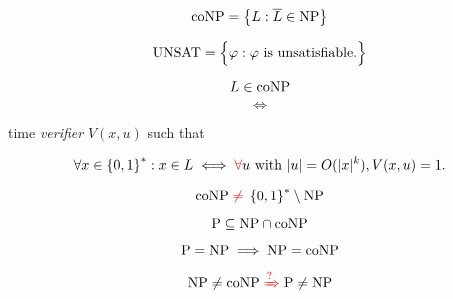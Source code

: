 
\begin{frame}
  \pause
  \[
	\text{coNP} = \left\{ L: \overline{L} \in \text{NP} \right\}
  \]

  \pause
  \[
	\text{UNSAT} = \Big\{ \varphi: \varphi \text{ is unsatisfiable.} \Big\}
  \]

  \pause
  \begin{definition}[\conp]
	\[
	  L \in \text{coNP}
	\]
	\[
	  \iff
	\]
	\begin{center}
	  \red{$\exists$}  time \emph{verifier} $V(x,u)$ such that
	\end{center}
	\pause 
	\[
	  \forall x \in \left\{ 0,1 \right\}^{\ast}: x \in L \iff \textcolor{red}{\forall} u \text{ with } |u| = O(|x|^{k}), V(x,u) = 1.
	\]
  \end{definition}
\end{frame}

\begin{frame}
  \[
	\text{coNP}{} \;\textcolor{red}{\neq}\; \left\{ 0,1 \right\}^{\ast} \setminus \text{NP}
  \]

  \pause
  \[
	\text{P} \subseteq \text{NP} \cap \text{coNP}
  \]

  \pause
  \[
	\text{P} = \text{NP} \implies \text{NP} = \text{coNP}
  \]

  \pause

  \pause
  \[
	\text{NP} \neq \text{coNP} \;\textcolor{red}{\xRightarrow{?}}\; \text{P} \neq \text{NP}
  \]
\end{frame}
